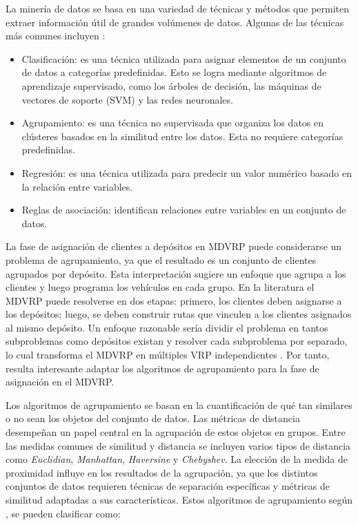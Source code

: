 La minería de datos se basa en una variedad de técnicas y métodos que permiten extraer información útil de grandes volúmenes de datos. Algunas de las técnicas más comunes incluyen \parencite{kesavarajStudyClassificationTechniques2013}:

\begin{itemize}
  \item Clasificación: es una técnica utilizada para asignar elementos de un conjunto de datos a categorías predefinidas. Esto se logra mediante algoritmos de aprendizaje supervisado, como los árboles de decisión, las máquinas de vectores de soporte (SVM) y las redes neuronales.
  \item Agrupamiento: es una técnica no supervisada que organiza los datos en clústeres basados en la similitud entre los datos. Esta no requiere categorías predefinidas.
  \item Regresión: es una técnica utilizada para predecir un valor numérico basado en la relación entre variables.
  \item Reglas de asociación: identifican relaciones entre variables en un conjunto de datos.
\end{itemize}

La fase de asignación de clientes a depósitos en MDVRP puede considerarse un problema de agrupamiento, ya que el resultado es un conjunto de clientes agrupados por depósito. Esta interpretación sugiere un enfoque que agrupa a los clientes y luego programa los vehículos en cada grupo. En la literatura el MDVRP puede resolverse en dos etapas: primero, los clientes deben asignarse a los depósitos; luego, se deben construir rutas que vinculen a los clientes asignados al mismo depósito. Un enfoque razonable sería dividir el problema en tantos subproblemas como depósitos existan y resolver cada subproblema por separado, lo cual transforma el MDVRP en múltiples VRP independientes \parencite{sekerSolvingMultiDepot2009}. Por tanto, resulta interesante adaptar los algoritmos de agrupamiento para la fase de asignación en el MDVRP.

Los algoritmos de agrupamiento se basan en la cuantificación de qué tan similares o no sean los objetos del conjunto de datos. Las métricas de distancia desempe\~nan un papel central en la agrupación de estos objetos en grupos. Entre las medidas comunes de similitud y distancia se incluyen varios tipos de distancia como \textit{Euclidian}, \textit{Manhattan}, \textit{Haversine} y \textit{Chebyshev}. La elección de la medida de proximidad influye en los resultados de la agrupación, ya que los distintos conjuntos de datos requieren técnicas de separación específicas y métricas de similitud adaptadas a sus características. Estos algoritmos de agrupamiento según  \parencite{koutroumbasPatternRecognition2008}, se pueden clasificar como:

